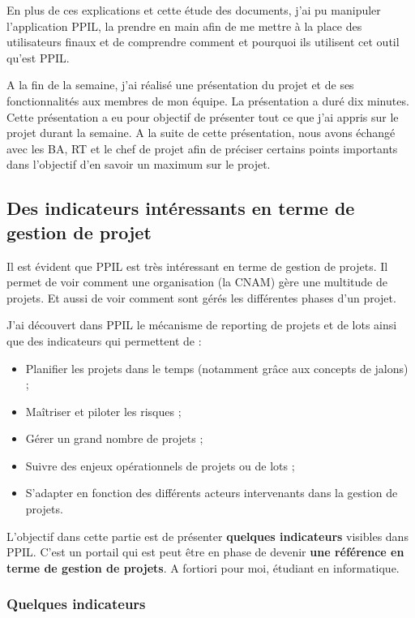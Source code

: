 En plus de ces explications et cette étude des documents, j'ai pu manipuler l'application PPIL, la prendre en main afin de me mettre à la place des utilisateurs finaux et de comprendre comment et pourquoi ils utilisent cet outil qu'est PPIL.

A la fin de la semaine, j'ai réalisé une présentation du projet et de ses fonctionnalités aux membres de mon équipe. La présentation a duré dix minutes. Cette présentation a eu pour objectif de présenter tout ce que j'ai appris sur le projet durant la semaine. A la suite de cette présentation, nous avons échangé avec les BA, RT et le chef de projet afin de préciser certains points importants dans l'objectif d'en savoir un maximum sur le projet.

\subsection{Des indicateurs intéressants en terme de gestion de projet}

Il est évident que PPIL est très intéressant en terme de gestion de projets. Il permet de voir comment une organisation (la CNAM) gère une multitude de projets. Et aussi de voir comment sont gérés les différentes phases d'un projet.

J'ai découvert dans PPIL le mécanisme de reporting de projets et de lots ainsi que des indicateurs qui permettent de :
\begin{itemize}
    \item Planifier les projets dans le temps (notamment grâce aux concepts de jalons) ;
    \item Maîtriser et piloter les risques ;
    \item Gérer un grand nombre de projets ;
    \item Suivre des enjeux opérationnels de projets ou de lots ;
    \item S'adapter en fonction des différents acteurs intervenants dans la gestion de projets.
\end{itemize}
\vspace{\baselineskip}
L'objectif dans cette partie est de présenter \textbf{quelques indicateurs} visibles dans PPIL. C'est un portail qui est peut être en phase de devenir \textbf{une référence en terme de gestion de projets}. A fortiori pour moi, étudiant en informatique. 

\subsubsection{Quelques indicateurs}

